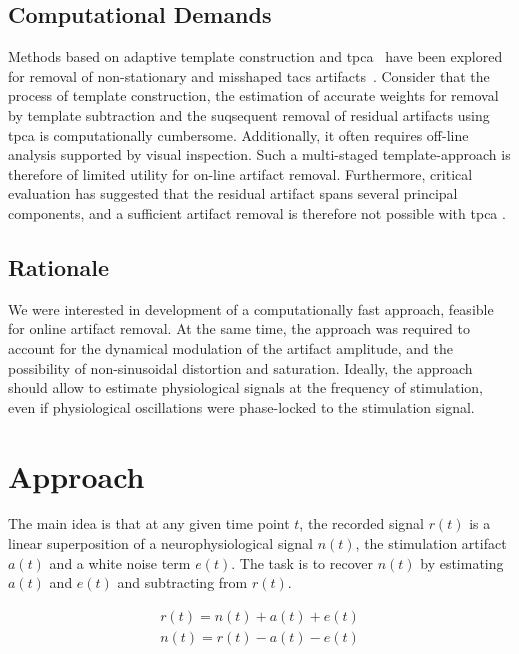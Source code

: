 \documentclass[a4paper]{article}
\begin{document}
\subsection{Computational Demands}

Methods based on adaptive template construction and \gls{tpca}~\citep{Niazy_2005} have been explored for removal of  non-stationary and misshaped \gls{tacs} artifacts~\citep{Helfrich_2014}.  Consider that the process of template construction, the estimation of accurate weights for removal by template subtraction and the suqsequent removal of residual artifacts using \gls{tpca} is computationally cumbersome. Additionally, it often requires off-line analysis supported by visual inspection.
Such a multi-staged template-approach is therefore of limited utility for on-line artifact removal. Furthermore, critical evaluation has suggested that the residual artifact spans several principal components, and a sufficient artifact removal is therefore not possible with \gls{tpca} \citep{Noury_2016}.

\subsection{Rationale}

We were interested in development of a computationally fast approach, feasible for online artifact removal. At the same time, the approach was required to account for the dynamical modulation of the artifact amplitude, and the possibility of non-sinusoidal distortion and saturation. Ideally, the approach should allow to estimate physiological signals at the frequency of stimulation, even if physiological oscillations were phase-locked to the stimulation signal.

\section{Approach}

The main idea is that at any given time point $t$, the recorded signal $r(t)$ is a linear super\-position of a neurophysiological signal $n(t)$, the stimulation artifact $a(t)$ and a white noise term $e(t)$. The task is to recover $n(t)$ by estimating $a(t)$ and $e(t)$ and subtracting from $r(t)$.

\begin{eqnarray}
    r(t) = n(t) + a(t) + e(t)\\
    n(t) = r(t) - a(t) - e(t)
\end{eqnarray}
\end{document}
